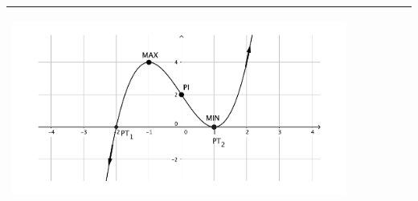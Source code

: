 \begin{center}
\begin{longtable}[h]{|p{}|p{}|p{}|}
{			\begin{center}
				\includegraphics*[width=0.9\textwidth]{img-07/chap-deriv-polinomica1.pdf}
			\end{center}
		}
		\\  [1.5ex] \hline 
	\end{longtable}
\end{center}
\pagebreak


